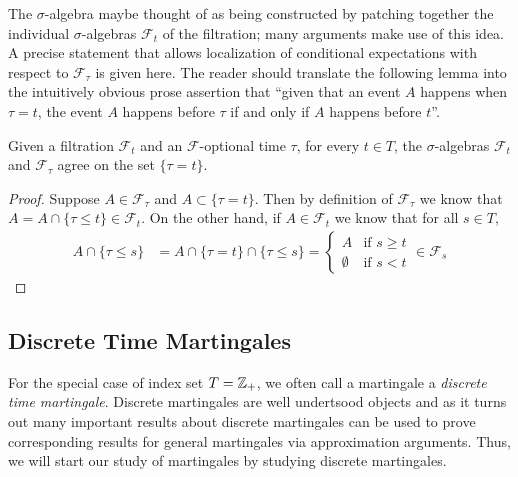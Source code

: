The $\sigma$-algebra maybe thought of as being constructed by patching
together the individual $\sigma$-algebras $\mathcal{F}_t$ of the
filtration; many arguments make use of this idea.  A precise statement
that allows localization of conditional expectations with respect to
$\mathcal{F}_\tau$ is given here.  The reader should translate the
following lemma into the intuitively obvious prose assertion that ``given
that an event $A$ happens when $\tau = t$, the event $A$ happens before
$\tau$ if and only if $A$ happens before $t$''.
\begin{lem}\label{LocalizationOfStoppedFiltration}Given a filtration $\mathcal{F}_t$ and an
  $\mathcal{F}$-optional time $\tau$, for every $t \in T$, the $\sigma$-algebras
  $\mathcal{F}_t$ and $\mathcal{F}_\tau$ agree on the set $\lbrace
  \tau = t\rbrace$.
\end{lem}
\begin{proof}
Suppose $A \in \mathcal{F}_\tau$ and $A \subset \lbrace \tau = t
\rbrace$.  Then by definition of $\mathcal{F}_\tau$ we know that $A = A
\cap \lbrace \tau \leq t \rbrace \in \mathcal{F}_t$.  On the other
hand, if $A \in \mathcal{F}_t$ we know that for all $s \in T$,
\begin{align*}
A \cap \lbrace \tau \leq s \rbrace &= A \cap \lbrace \tau = t
\rbrace \cap\lbrace \tau \leq s \rbrace = \begin{cases}
A & \text{if $s \geq t$} \\
\emptyset & \text{if $s < t$}
\end{cases}
\in \mathcal{F}_s
\end{align*}
\end{proof}

\subsection{Discrete Time Martingales}
For the special case of index set $T = \mathbb{Z}_+$, we often call a
martingale a \emph{discrete time martingale}.  Discrete martingales are well
undertsood objects and as it turns out many important results about discrete
martingales can be used to prove corresponding results for general martingales via approximation
arguments.  Thus, we will start our study of martingales by studying
discrete martingales.

